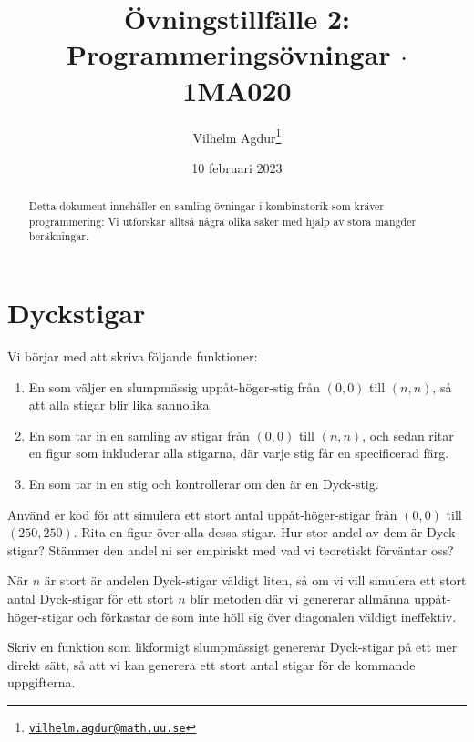 \documentclass[nobib]{tufte-handout}
\title{Övningstillfälle 2: Programmeringsövningar $\cdot$ 1MA020}
\author[Vilhelm Agdur]{Vilhelm Agdur\thanks{\href{mailto:vilhelm.agdur@math.uu.se}{\nolinkurl{vilhelm.agdur@math.uu.se}}}}
\date{10 februari 2023}
\begin{document}
\maketitle%

\begin{abstract}
\noindent
Detta dokument innehåller en samling övningar i kombinatorik som kräver programmering: Vi utforskar alltså några olika saker med hjälp av stora mängder beräkningar.
\end{abstract}


\section{Dyckstigar}

\begin{xca}
    Vi börjar med att skriva följande funktioner:
    \begin{enumerate}
        \item En som väljer en slumpmässig uppåt-höger-stig från $(0,0)$ till $(n,n)$, så att alla stigar blir lika sannolika.
        \item En som tar in en samling av stigar från $(0,0)$ till $(n,n)$, och sedan ritar en figur som inkluderar alla stigarna, där varje stig får en specificerad färg.
        \item En som tar in en stig och kontrollerar om den är en Dyck-stig.
    \end{enumerate}
\end{xca}

\begin{xca}
    Använd er kod för att simulera ett stort antal uppåt-höger-stigar från $(0,0)$ till $(250,250)$. Rita en figur över alla dessa stigar. Hur stor andel av dem är Dyck-stigar? Stämmer den andel ni ser empiriskt med vad vi teoretiskt förväntar oss?
\end{xca}

\begin{xca}
    När $n$ är stort är andelen Dyck-stigar väldigt liten, så om vi vill simulera ett stort antal Dyck-stigar för ett stort $n$ blir metoden där vi genererar allmänna uppåt-höger-stigar och förkastar de som inte höll sig över diagonalen väldigt ineffektiv.

    Skriv en funktion som likformigt slumpmässigt genererar Dyck-stigar på ett mer direkt sätt, så att vi kan generera ett stort antal stigar för de kommande uppgifterna.
\end{xca}
\end{document}
